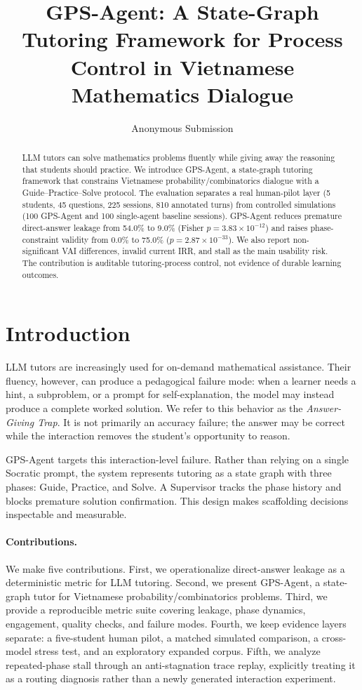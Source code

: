 \documentclass[11pt]{article}
\title{GPS-Agent: A State-Graph Tutoring Framework for Process Control in Vietnamese Mathematics Dialogue}
\author{Anonymous Submission}
\begin{document}
\ifdefined\pagewiselinenumbers\pagewiselinenumbers\fi
\maketitle

\begin{abstract}
LLM tutors can solve mathematics problems fluently while giving away the reasoning that students should practice. We introduce GPS-Agent, a state-graph tutoring framework that constrains Vietnamese probability/combinatorics dialogue with a Guide--Practice--Solve protocol. The evaluation separates a real human-pilot layer (5 students, 45 questions, 225 sessions, 810 annotated turns) from controlled simulations (100 GPS-Agent and 100 single-agent baseline sessions). GPS-Agent reduces premature direct-answer leakage from 54.0\% to 9.0\% (Fisher $p=3.83\times10^{-12}$) and raises phase-constraint validity from 0.0\% to 75.0\% ($p=2.87\times10^{-33}$). We also report non-significant VAI differences, invalid current IRR, and stall as the main usability risk. The contribution is auditable tutoring-process control, not evidence of durable learning outcomes.
\end{abstract}

\section{Introduction}
LLM tutors are increasingly used for on-demand mathematical assistance. Their fluency, however, can produce a pedagogical failure mode: when a learner needs a hint, a subproblem, or a prompt for self-explanation, the model may instead produce a complete worked solution. We refer to this behavior as the \emph{Answer-Giving Trap}. It is not primarily an accuracy failure; the answer may be correct while the interaction removes the student's opportunity to reason.

GPS-Agent targets this interaction-level failure. Rather than relying on a single Socratic prompt, the system represents tutoring as a state graph with three phases: Guide, Practice, and Solve. A Supervisor tracks the phase history and blocks premature solution confirmation. This design makes scaffolding decisions inspectable and measurable.

\paragraph{Contributions.} We make five contributions. First, we operationalize direct-answer leakage as a deterministic metric for LLM tutoring. Second, we present GPS-Agent, a state-graph tutor for Vietnamese probability/combinatorics problems. Third, we provide a reproducible metric suite covering leakage, phase dynamics, engagement, quality checks, and failure modes. Fourth, we keep evidence layers separate: a five-student human pilot, a matched simulated comparison, a cross-model stress test, and an exploratory expanded corpus. Fifth, we analyze repeated-phase stall through an anti-stagnation trace replay, explicitly treating it as a routing diagnosis rather than a newly generated interaction experiment.
\end{document}
